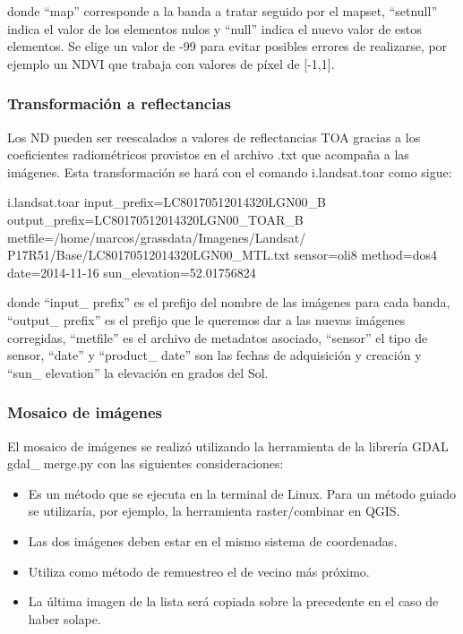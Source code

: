 donde ``map'' corresponde a la banda a tratar seguido por el mapset, ``setnull'' indica el valor de los elementos nulos y ``null'' indica el nuevo valor de estos elementos. Se elige un valor de -99 para evitar posibles errores de realizarse, por ejemplo un \ac{NDVI} que trabaja con valores de píxel de [-1,1].

\subsubsection{Transformación a reflectancias}
Los \ac{ND} pueden ser reescalados a valores de reflectancias \ac{TOA} gracias a los coeficientes radiométricos provistos en el archivo .txt que acompaña a las imágenes. Esta transformación se hará con el comando i.landsat.toar como sigue:
\begin{center}
\begin{boxedverbatim}
	i.landsat.toar
	input_prefix=LC80170512014320LGN00_B
	output_prefix=LC80170512014320LGN00_TOAR_B
	metfile=/home/marcos/grassdata/Imagenes/Landsat/
	P17R51/Base/LC80170512014320LGN00_MTL.txt
	sensor=oli8
	method=dos4
	date=2014-11-16
	sun_elevation=52.01756824
\end{boxedverbatim}
\end{center}

donde ``input\_ prefix'' es el prefijo del nombre de las imágenes para cada banda, ``output\_ prefix'' es el prefijo que le queremos dar a las nuevas imágenes corregidas, ``metfile'' es el archivo de metadatos asociado, ``sensor'' el tipo de sensor, ``date'' y ``product\_ date'' son las fechas de adquisición y creación y ``sun\_ elevation'' la elevación en grados del Sol.

\subsubsection{Mosaico de imágenes}
El mosaico de imágenes se realizó utilizando la herramienta de la librería \ac{GDAL} gdal\_ merge.py con las siguientes consideraciones:

\begin{itemize}
	\item Es un método que se ejecuta en la terminal de Linux. Para un método guiado se utilizaría, por ejemplo, la herramienta raster/combinar en QGIS.
	\item Las dos imágenes deben estar en el mismo sistema de coordenadas.
	\item Utiliza como método de remuestreo el de vecino más próximo.
	\item La última imagen de la lista será copiada sobre la precedente en el caso de haber solape.
\end{itemize}

